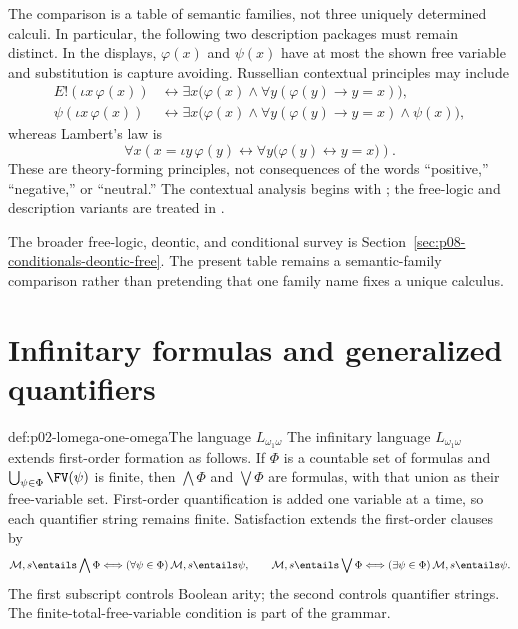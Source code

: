 The comparison is a table of semantic families, not three uniquely determined
calculi.  In particular, the following two description packages must remain
distinct.  In the displays, \(\varphi(x)\) and \(\psi(x)\) have at most the
shown free variable and substitution is capture avoiding.  Russellian
contextual principles may include
\[
\begin{aligned}
 E!(\iota x\,\varphi(x))
 &\leftrightarrow
 \exists x\bigl(\varphi(x)\land
   \forall y(\varphi(y)\to y=x)\bigr),\\
 \psi(\iota x\,\varphi(x))
 &\leftrightarrow
 \exists x\bigl(\varphi(x)\land
   \forall y(\varphi(y)\to y=x)\land\psi(x)\bigr),
\end{aligned}
\]
whereas Lambert's law is
\[
 \forall x\left(
   x=\iota y\,\varphi(y)
   \leftrightarrow
   \forall y\bigl(\varphi(y)\leftrightarrow y=x\bigr)
 \right).
\]
These are theory-forming principles, not consequences of the words
``positive,'' ``negative,'' or ``neutral.''  The contextual analysis begins
with \cite{Russell1905}; the free-logic and description variants are treated
in \cite{Lambert1967,Bencivenga1986,Lehmann2002,GratzlPavlovicNolt2025}.

The broader free-logic, deontic, and conditional survey is
Section~\ref{sec:p08-conditionals-deontic-free}.  The present table remains a
semantic-family comparison rather than pretending that one family name fixes a
unique calculus.

\section{Infinitary formulas and generalized quantifiers}
\label{sec:p02-infinitary-generalized}

\begin{hbdefinition}{def:p02-lomega-one-omega}{The language \(L_{\omega_1\omega}\)}
The infinitary language \(L_{\omega_1\omega}\) extends first-order formation
as follows.  If \(\Phi\) is a countable set of formulas and
\(\bigcup_{\psi\in\Phi}\FV(\psi)\) is finite, then
\(\bigwedge\Phi\) and \(\bigvee\Phi\) are formulas, with that union as their
free-variable set.  First-order quantification is added one variable at a time,
so each quantifier string remains finite.  Satisfaction extends the
first-order clauses by
\[
 \mathcal M,s\entails\bigwedge\Phi
 \Longleftrightarrow (\forall\psi\in\Phi)\,\mathcal M,s\entails\psi,
 \qquad
 \mathcal M,s\entails\bigvee\Phi
 \Longleftrightarrow (\exists\psi\in\Phi)\,\mathcal M,s\entails\psi.
\]
The first subscript controls Boolean arity; the second controls quantifier
strings.  The finite-total-free-variable condition is part of the grammar.
\end{hbdefinition}

